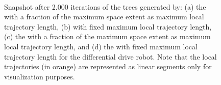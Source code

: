 \begin{figure} [htp]
    \centering
    \\
    \caption{Snapshot after 2.000 iterations of the trees generated by: (a) the  with a fraction of the maximum space extent as maximum local trajectory length, (b)  with fixed maximum local trajectory length, (c) the  with a fraction of the maximum space extent as maximum local trajectory length, and (d) the  with fixed maximum local trajectory length for the differential drive robot.
    Note that the local trajectories (in orange) are represented as linear segments only for visualization purposes.}%
    \label{fig:unic_tree}%
\end{figure}

